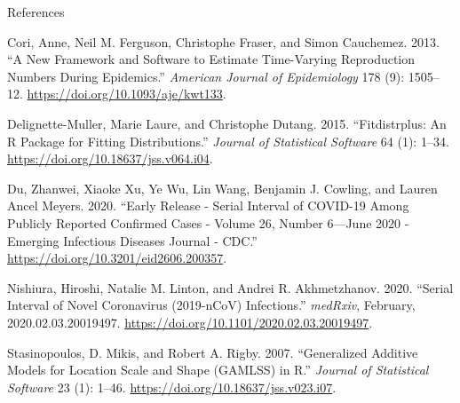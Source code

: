 \documentclass[
  ignorenonframetext,
  aspectratio=169,
]{beamer}
\newlength{\cslhangindent}
\newlength{\cslentryspacingunit} %
\newenvironment{CSLReferences}[2] %
 {%
  \setlength{\parindent}{0pt}
  \ifodd #1
  \let\oldpar\par
  \def\par{\hangindent=\cslhangindent\oldpar}
  \fi
  \setlength{\parskip}{#2\cslentryspacingunit}
 }%
 {}
\begin{document}
\begin{frame}{References}
\protect\hypertarget{references}{}
\scriptsize

\hypertarget{refs}{}
\begin{CSLReferences}{1}{0}
\leavevmode{}%
Cori, Anne, Neil M. Ferguson, Christophe Fraser, and Simon Cauchemez.
2013. {``A {New Framework} and {Software} to {Estimate Time}-{Varying
Reproduction Numbers During Epidemics}.''} \emph{American Journal of
Epidemiology} 178 (9): 1505--12.
\url{https://doi.org/10.1093/aje/kwt133}.

\leavevmode{}%
Delignette-Muller, Marie Laure, and Christophe Dutang. 2015.
{``Fitdistrplus: {An R Package} for {Fitting Distributions}.''}
\emph{Journal of Statistical Software} 64 (1): 1--34.
\url{https://doi.org/10.18637/jss.v064.i04}.

\leavevmode{}%
Du, Zhanwei, Xiaoke Xu, Ye Wu, Lin Wang, Benjamin J. Cowling, and Lauren
Ancel Meyers. 2020. {``Early {Release} - {Serial Interval} of {COVID}-19
Among {Publicly Reported Confirmed Cases} - {Volume} 26, {Number}
6---{June} 2020 - {Emerging Infectious Diseases} Journal - {CDC}.''}
\url{https://doi.org/10.3201/eid2606.200357}.

\leavevmode{}%
Nishiura, Hiroshi, Natalie M. Linton, and Andrei R. Akhmetzhanov. 2020.
{``Serial Interval of Novel Coronavirus (2019-{nCoV}) Infections.''}
\emph{medRxiv}, February, 2020.02.03.20019497.
\url{https://doi.org/10.1101/2020.02.03.20019497}.

\leavevmode{}%
Stasinopoulos, D. Mikis, and Robert A. Rigby. 2007. {``Generalized
{Additive Models} for {Location Scale} and {Shape} ({GAMLSS}) in {R}.''}
\emph{Journal of Statistical Software} 23 (1): 1--46.
\url{https://doi.org/10.18637/jss.v023.i07}.

\end{CSLReferences}
\end{frame}
\end{document}
